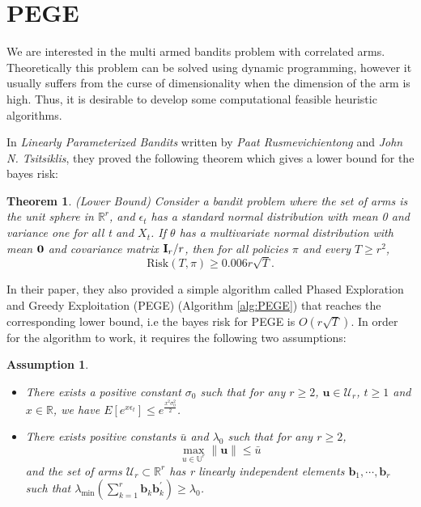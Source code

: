 \documentclass{article}
\newtheorem{theorem}{Theorem}
\theoremstyle{plain}
\newtheorem{assumption}{Assumption}
\theoremstyle{definition}
\begin{document}
\section{PEGE}

We are interested in the multi armed bandits problem with correlated arms. Theoretically this problem can be solved using dynamic programming, however it usually suffers from the curse of dimensionality when the dimension of the arm is high. Thus, it is desirable to develop some computational feasible heuristic algorithms.

In \textit{Linearly Parameterized Bandits} written by \textit{Paat Rusmevichientong} and \textit{John N. Tsitsiklis}, they proved the following theorem which gives a lower bound for the bayes risk:

\begin{theorem}(Lower Bound)
Consider a bandit problem where the set of arms is the unit sphere in $\mathbb{R}^{r}$, and $\epsilon_{t}$ has a standard normal distribution with mean 0 and variance one for all t and $X_{t}$. If $\theta$ has a multivariate normal distribution with mean $\bold{0}$ and covariance matrix $\bold{I}_{r}/r$, then for all policies $\pi$ and every $T\geq r^{2}$,
\begin{equation}
\text{Risk}(T,\pi)\geq 0.006r\sqrt{T}. \nonumber 
\end{equation}
\end{theorem}

In their paper, they also provided a simple algorithm called Phased Exploration and Greedy Exploitation (PEGE) (Algorithm \ref{alg:PEGE}) that reaches the corresponding lower bound, i.e the bayes risk for PEGE is $O(r\sqrt{T})$. In order for the algorithm to work, it requires the following two assumptions:

\begin{assumption}
\begin{itemize}
\item There exists a positive constant $\sigma_{0}$ such that for any $r\geq 2$, $\textbf{u}\in \mathcal{U}_{r}$, $t\geq 1$ and $x\in \mathbb{R}$, we have $E[e^{x \epsilon_{t}}]\leq e^{\frac{x^{2}\sigma_{0}^{2}}{2}}$.
\item There exists positive constants $\bar{u}$ and $\lambda_{0}$ such that for any $r\geq 2$,
\begin{equation}
\max_{u\in \mathbb{U}^{r}}\|\textbf{u}\|\leq \bar{u} \nonumber
\end{equation}
and the set of arms $\mathcal{U}_{r}\subset 
\mathbb{R}^{r}$ has r linearly independent elements $\textbf{b}_{1},\cdots,\textbf{b}_{r}$ such that $\lambda_{\min}(\sum_{k=1}^{r}\textbf{b}_{k}\textbf{b}_{k}^{'})\geq \lambda_{0}$.
\end{itemize}
\end{assumption}
\end{document}

